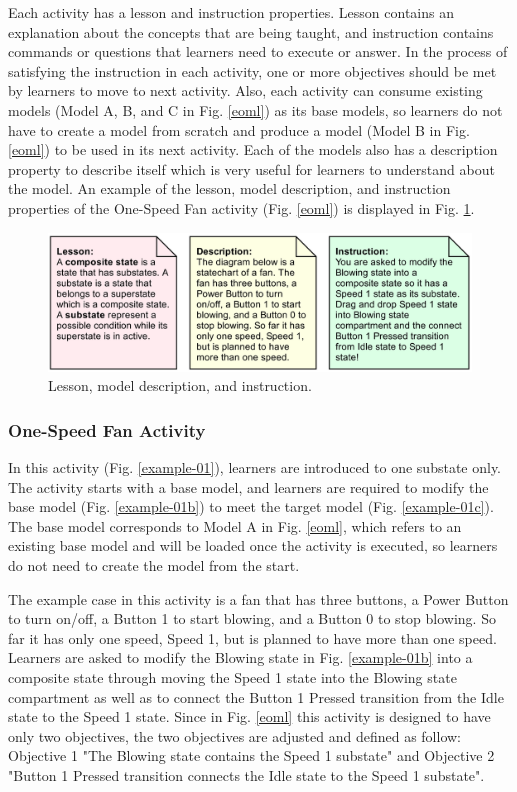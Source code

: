 \documentclass[conference]{IEEEtran}
\begin{document}
Each activity has a lesson and instruction properties. Lesson contains an explanation about the concepts that are being taught, and instruction contains commands or questions that learners need to execute or answer. In the process of satisfying the instruction in each activity, one or more objectives should be met by learners to move to next activity. Also, each activity can consume existing models (Model A, B, and C in Fig. \ref{eoml}) as its base models, so learners do not have to create a model from scratch and produce a model (Model B in Fig. \ref{eoml}) to be used in its next activity. Each of the models also has a description property to describe itself which is very useful for learners to understand about the model. An example of the lesson, model description, and instruction properties of the One-Speed Fan activity (Fig. \ref{eoml}) is displayed in Fig. \ref{example-01a}.    

\begin{figure}[th]
\centering
\includegraphics[width=\linewidth]{example-01a}
\caption{Lesson, model description, and instruction.}
\label{example-01a}
\end{figure}

\subsubsection{One-Speed Fan Activity}
In this activity (Fig. \ref{example-01}), learners are introduced to one substate only. The activity starts with a base model, and learners are required to modify the base model (Fig. \ref{example-01b}) to meet the target model (Fig. \ref{example-01c}). The base model corresponds to Model A in Fig. \ref{eoml}, which refers to an existing base model and will be loaded once the activity is executed, so learners do not need to create the model from the start. 

The example case in this activity is a fan that has three buttons, a Power Button to turn on/off, a Button 1 to start blowing, and a Button 0 to stop blowing. So far it has only one speed, Speed 1, but is planned to have more than one speed. Learners are asked to modify the Blowing state in Fig. \ref{example-01b} into a composite state through moving the Speed 1 state into the Blowing state compartment as well as to connect the Button 1 Pressed transition from the Idle state to the Speed 1 state. Since in Fig. \ref{eoml} this activity is designed to have only two objectives, the two objectives are adjusted and defined as follow: Objective 1 "The Blowing state contains the Speed 1 substate" and Objective 2 "Button 1 Pressed transition connects the Idle state to the Speed 1 substate".
\end{document}
